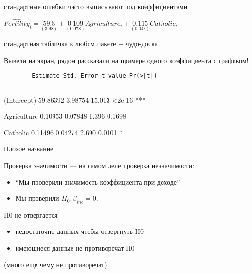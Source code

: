 \documentclass[ignorenonframetext,]{beamer}
\begin{document}
\begin{frame}{стандартные ошибки часто выписывают под коэффициентами}

$\widehat{Fertility}_i=\underset{(3.98)}{59.8} + \underset{(0.078)}{0.109} Agriculture_i + \underset{(0.042)}{0.115} Catholic_i$

\end{frame}

\begin{frame}[fragile]{стандартная табличка в любом пакете + чудо-доска}

Вывели на экран, рядом рассказали на примере одного коэффициента с
графиком!

\begin{verbatim}
        Estimate Std. Error t value Pr(>|t|)   
        
\end{verbatim}

(Intercept) 59.86392 3.98754 15.013 \textless{}2e-16 ***

Agriculture 0.10953 0.07848 1.396 0.1698

Catholic 0.11496 0.04274 2.690 0.0101 *

\end{frame}

\begin{frame}{Плохое название}

Проверка значимости --- на самом деле проверка незначимости:

\begin{itemize}
\item
  ``Мы проверили значимость коэффициента при доходе''
\item
  Мы проверили $H_0: \beta_{inc}=0$.
\end{itemize}

\end{frame}

\begin{frame}{H0 не отвергается}

\begin{itemize}
\item
  недостаточно данных чтобы отвергнуть H0
\item
  имеющиеся данные не противоречат H0
\end{itemize}

(много еще чему не противоречат)

\end{frame}
\end{document}
